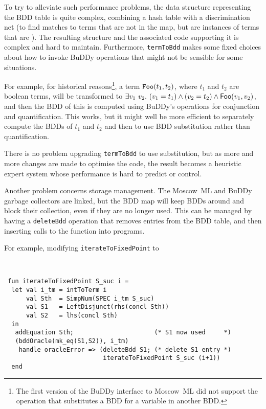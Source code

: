 \documentclass[12pt]{article}
\newcommand{\bnind}[1]{\index[MLbn]{#1}}
\newcommand{\con}[1]{\mbox{\sf #1}}
\newcommand{\ml}[1]{{\tt #1}}
\newcommand{\mosml}{Moscow~ML\xspace}
\newcommand{\Buddy}{BuDDy\xspace}
\begin{document}
To try to
alleviate such performance problems, the data structure representing
the BDD table is quite complex, combining a hash table with a
discrimination net (to find matches to terms that are not in the map,
but are instances of terms that are \cite{Charniak80}). The resulting structure and the
associated code supporting it is complex and hard to
maintain. Furthermore, \ml{termToBdd} makes some fixed choices about
how to invoke \Buddy{} operations that might not be sensible for some
situations. 

For example, for historical reasons\footnote{The first version of the \Buddy{} interface to
\mosml{} did not support the operation that substitutes a BDD for a
variable in another BDD.}, a term
$\ml{Foo}(t_1,t_2)$, where $t_1$ and $t_2$ are boolean terms, will be
transformed to $\exists v_1~v_2.~(v_1=t_1) \wedge (v_2=t_2) \wedge
\con{Foo}(v_1,v_2)$, and then the BDD of this is computed using \Buddy's
operations for conjunction and quantification. This works, but it
might well be more efficient to separately compute the BDDs of $t_1$
and $t_2$ and then to use BDD substitution rather than
quantification.  

There is no problem upgrading
\ml{termToBdd} to use substitution, but as more and more changes are
made to optimise the code, the result becomes a heuristic expert
system whose performance is hard to predict or control.

Another problem concerns storage management. The \mosml{} and \Buddy{}
garbage collectors are linked, but the BDD map will keep BDDs around
and block their collection, even if they are no longer used. This can be
managed by having a \ml{deleteBdd}\bnind{\ml{deleteBdd}} operation that removes
entries from the BDD table, and then inserting calls to the function
into programs. 

For example, modifying
\ml{iterateToFixedPoint} to

{\baselineskip11pt\begin{verbatim}


 fun iterateToFixedPoint S_suc i =
  let val i_tm = intToTerm i
      val Sth  = SimpNum(SPEC i_tm S_suc)
      val S1   = LeftDisjunct(rhs(concl Sth))
      val S2   = lhs(concl Sth)              
  in
   addEquation Sth;                      (* S1 now used     *)
   (bddOracle(mk_eq(S1,S2)), i_tm)
    handle oracleError => (deleteBdd S1; (* delete S1 entry *)
                           iterateToFixedPoint S_suc (i+1))
  end
\end{verbatim}}\bnind{\ml{iterateToFixedPoint}}
\end{document}
